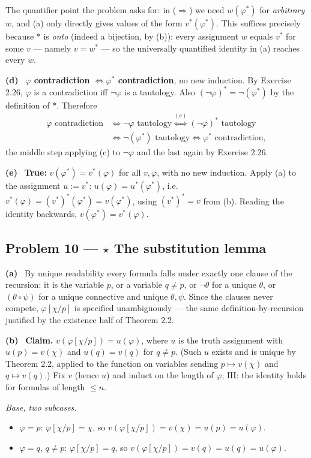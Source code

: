 \documentclass[11pt]{article}
\newcommand{\bin}{\mathbin{\circ}}
\newcommand{\solpart}[1]{\smallskip\noindent\textbf{(#1)}\ }
\newcommand{\prob}[2]{\subsection*{Problem #1 --- #2}}
\begin{document}
The quantifier point the problem asks for: in ($\Rightarrow$) we need
$w(\varphi^*)$ for \emph{arbitrary} $w$, and (a) only directly gives values of the
form $v^*(\varphi^*)$. This suffices precisely because $*$ is \emph{onto} (indeed a
bijection, by (b)): every assignment $w$ equals $v^*$ for some $v$ --- namely
$v=w^*$ --- so the universally quantified identity in (a) reaches every $w$.

\solpart{d} \textbf{$\varphi$ contradiction $\iff\varphi^*$ contradiction}, no new
induction. By Exercise 2.26, $\varphi$ is a contradiction iff $\lnot\varphi$ is a
tautology. Also $(\lnot\varphi)^*=\lnot(\varphi^*)$ by the definition of $*$.
Therefore
\[
\begin{aligned}
\varphi\text{ contradiction}&\iff\lnot\varphi\text{ tautology}
\overset{(c)}{\iff}(\lnot\varphi)^*\text{ tautology}\\
&\iff\lnot(\varphi^*)\text{ tautology}\iff\varphi^*\text{ contradiction},
\end{aligned}
\]
the middle step applying (c) to $\lnot\varphi$ and the last again by Exercise 2.26.

\solpart{e} \textbf{True:} $v(\varphi^*)=v^*(\varphi)$ for all $v,\varphi$, with no
new induction. Apply (a) to the assignment $u:=v^*$: $u(\varphi)=u^*(\varphi^*)$,
i.e.\ $v^*(\varphi)=(v^*)^*(\varphi^*)=v(\varphi^*)$, using $(v^*)^*=v$ from (b).
Reading the identity backwards, $v(\varphi^*)=v^*(\varphi)$.

\prob{10}{$\star$ The substitution lemma}

\solpart{a} By unique readability every formula falls under exactly one clause of
the recursion: it is the variable $p$, or a variable $q\neq p$, or $\lnot\theta$
for a unique $\theta$, or $(\theta\bin\psi)$ for a unique connective and unique
$\theta,\psi$. Since the clauses never compete, $\varphi[\chi/p]$ is specified
unambiguously --- the same definition-by-recursion justified by the existence half
of Theorem 2.2.

\solpart{b} \textbf{Claim.} $v(\varphi[\chi/p])=u(\varphi)$, where $u$ is the truth
assignment with $u(p)=v(\chi)$ and $u(q)=v(q)$ for $q\neq p$. (Such $u$ exists and
is unique by Theorem 2.2, applied to the function on variables sending $p\mapsto
v(\chi)$ and $q\mapsto v(q)$.) Fix $v$ (hence $u$) and induct on the length of
$\varphi$; IH: the identity holds for formulas of length $\le n$.

\emph{Base, two subcases.}
\begin{itemize}[nosep]
\item $\varphi=p$: $\varphi[\chi/p]=\chi$, so $v(\varphi[\chi/p])=v(\chi)=u(p)=
u(\varphi)$.
\item $\varphi=q$, $q\neq p$: $\varphi[\chi/p]=q$, so $v(\varphi[\chi/p])=v(q)=
u(q)=u(\varphi)$.
\end{itemize}
\end{document}
